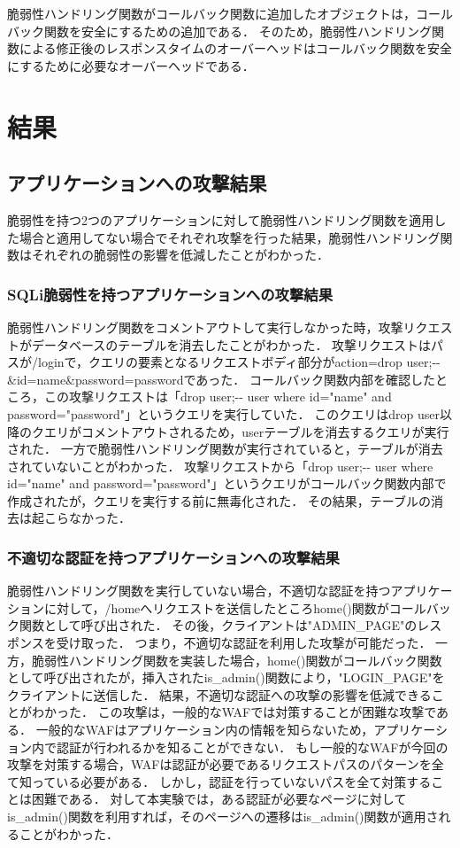 \documentclass[a4paper,12pt]{jreport}
\begin{document}
脆弱性ハンドリング関数がコールバック関数に追加したオブジェクトは，コールバック関数を安全にするための追加である．
そのため，脆弱性ハンドリング関数による修正後のレスポンスタイムのオーバーヘッドはコールバック関数を安全にするために必要なオーバーヘッドである．

\chapter{結果}
\section{アプリケーションへの攻撃結果}
脆弱性を持つ2つのアプリケーションに対して脆弱性ハンドリング関数を適用した場合と適用してない場合でそれぞれ攻撃を行った結果，脆弱性ハンドリング関数はそれぞれの脆弱性の影響を低減したことがわかった．

\subsection{SQLi脆弱性を持つアプリケーションへの攻撃結果}
脆弱性ハンドリング関数をコメントアウトして実行しなかった時，攻撃リクエストがデータベースのテーブルを消去したことがわかった．
攻撃リクエストはパスが/loginで，クエリの要素となるリクエストボディ部分がaction=drop user;-\--\&id=name\&password=passwordであった．
コールバック関数内部を確認したところ，この攻撃リクエストは「drop user;-\-- user where id="name" and password="password"」というクエリを実行していた．
このクエリはdrop user以降のクエリがコメントアウトされるため，userテーブルを消去するクエリが実行された．
一方で脆弱性ハンドリング関数が実行されていると，テーブルが消去されていないことがわかった．
攻撃リクエストから「drop user;-\-- user where id="name" and password="password"」というクエリがコールバック関数内部で作成されたが，クエリを実行する前に無毒化された．
その結果，テーブルの消去は起こらなかった．

\subsection{不適切な認証を持つアプリケーションへの攻撃結果}
脆弱性ハンドリング関数を実行していない場合，不適切な認証を持つアプリケーションに対して，/homeへリクエストを送信したところhome()関数がコールバック関数として呼び出された．
その後，クライアントは"ADMIN\_PAGE"のレスポンスを受け取った．
つまり，不適切な認証を利用した攻撃が可能だった．
一方，脆弱性ハンドリング関数を実装した場合，home()関数がコールバック関数として呼び出されたが，挿入されたis\_admin()関数により，"LOGIN\_PAGE"をクライアントに送信した．
結果，不適切な認証への攻撃の影響を低減できることがわかった．
この攻撃は，一般的なWAFでは対策することが困難な攻撃である．
一般的なWAFはアプリケーション内の情報を知らないため，アプリケーション内で認証が行われるかを知ることができない．
もし一般的なWAFが今回の攻撃を対策する場合，WAFは認証が必要であるリクエストパスのパターンを全て知っている必要がある．
しかし，認証を行っていないパスを全て対策することは困難である．
対して本実験では，ある認証が必要なページに対してis\_admin()関数を利用すれば，そのページへの遷移はis\_admin()関数が適用されることがわかった．
\end{document}
